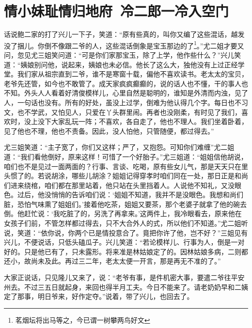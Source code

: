 \documentclass[12pt,oneside]{book}
\begin{document}
\chapter{情小妹耻情归地府~冷二郎一冷入空门}
话说鲍二家的打了兴儿一下子，笑道：“原有些真的，叫你又编了这些混话，越发没了捆儿。你倒不像跟二爷的人，这些混话倒象是宝玉那边的了\footnote{茗烟坛将出马等之，今已谓一树攀两鸟好文}。”尤二姐才要又问，忽见尤三姐笑问道：“可是你们家那宝玉，除了上学，他作些什么？”兴儿笑道：“姨娘别问他，说起来，姨娘也未必信。他长了这么大，独他没有上过正经学堂。我们家从祖宗直到二爷，谁不是寒窗十载，偏他不喜欢读书。老太太的宝贝，老爷先还管，如今也不敢管了。成天家疯疯癫癫的，说的话人也不懂，干的事人也不知。外头人人看着好清俊模样儿，心里自然是聪明的，谁知是外清而内浊，见了人，一句话也没有。所有的好处，虽没上过学，倒难为他认得几个字。每日也不习文，也不学武，又怕见人，只爱在丫头群里闹。再者也没刚柔，有时见了我们，喜欢时，没上没下大家乱玩一阵；不喜欢，各自走了，他也不理人。我们坐着卧着，见了他也不理，他也不责备。因此，没人怕他，只管随便，都过得去。”

尤三姐笑道：“主子宽了，你们又这样；严了，又抱怨。可知你们难缠”尤二姐道：“我们看他倒好，原来这样！可惜了一个好胎子。”尤三姐道：“姐姐信他胡说，咱们也不是见过一面两面的？行事、言谈、吃喝，原有些女儿气，那是天天只在里头惯了的。若说胡涂，哪些儿胡涂？姐姐记得穿孝时咱们同在一处，那日正是和尚们进来绕棺，咱们都在那里站着，他只站在头里挡着人。人说他不知礼，又没眼色。过后，他没悄悄的告诉咱们说：‘姐姐不知道，我并不是没眼色。我想和尚们脏，恐怕气味熏了姐姐们。’接着他吃茶，姐姐又要茶，那个老婆子就拿了他的碗去倒。他赶忙说：‘我吃脏了的，另洗了再拿来。’这两件上，我冷眼看去，原来他在女孩子们前，不管怎样都过得去，只不大合外人的式，所以他们不知道。”尤二姐听说，笑道：“依你说，你两个已是情投意合了。竟把你许了他，岂不好？”三姐见有兴儿，不便说话，只低头磕瓜子。兴儿笑道：“若论模样儿、行事为人，倒是一对好的。只是他已有了，只未露形。将来准是林姑娘定了的。因林姑娘多病，二则都还小，故尚未及此。再过三二年，老太太便一开言，那是再无不准的了。”

大家正说话，只见隆儿又来了，说：“老爷有事，是件机密大事，要遣二爷往平安州去。不过三五日就起身，来回也得半月工夫。今日不能来了。请老奶奶早和二姨定了那事，明日爷来，好作定夺。”说着，带了兴儿，也回去了。
\end{document}
